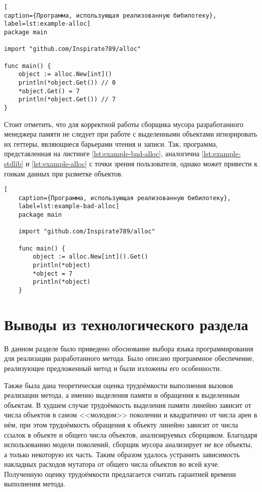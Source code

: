 \begin{lstlisting}[
caption={Программа, использующая реализованную бибилотеку},
label=lst:example-alloc]
package main

import "github.com/Inspirate789/alloc"

func main() {
	object := alloc.New[int]()
	println(*object.Get()) // 0
	*object.Get() = 7
	println(*object.Get()) // 7
}
\end{lstlisting}

Стоит отметить, что для корректной работы сборщика мусора разработанного менеджера памяти не следует при работе с выделенными объектами игнорировать их геттеры, являющиеся барьерами чтения и записи. Так, программа, представленная на листинге \ref{lst:example-bad-alloc}, аналогична \ref{lst:example-stdlib} и \ref{lst:example-alloc} с точки зрения пользователя, однако может привести к гонкам данных при разметке объектов.

\begin{lstlisting}[
	caption={Программа, использующая реализованную бибилотеку},
	label=lst:example-bad-alloc]
	package main
	
	import "github.com/Inspirate789/alloc"
	
	func main() {
		object := alloc.New[int]().Get()
		println(*object)
		*object = 7
		println(*object)
	}
\end{lstlisting}



\section*{Выводы из технологического раздела}

В данном разделе было приведено обоснование выбора языка программирования для реализации разработанного метода. Было описано программное обеспечение, реализующее предложенный метод и были изложены его особенности.

Также была дана теоретическая оценка трудоёмкости выполнения вызовов реализации метода, а именно выделения памяти и обращения к выделенным объектам. В худшем случае трудоёмкость выделения памяти линейно зависит от числа объектов в самом <<молодом>> поколении и квадратично от числа арен в нём, при этом трудоёмкость обращения к объекту линейно зависит от числа ссылок в объекте и общего числа объектов, анализируемых сборщиком. Благодаря использованию модели поколений, сборщик мусора анализирует не все объекты, а только некоторую их часть. Таким образом удалось устранить зависимость накладных расходов мутатора от общего числа объектов во всей куче. Полученную оценку трудоёмкости предлагается считать гарантией времени выполнения метода.
